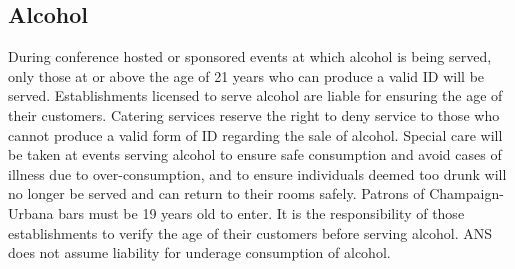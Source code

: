 \subsection{Alcohol}
During conference hosted or sponsored events at which alcohol is being served, only those at or above the age of 21 years who can produce a valid ID will be served. Establishments licensed to serve alcohol are liable for ensuring the age of their customers. Catering services reserve the right to deny service to those who cannot produce a valid form of ID regarding the sale of alcohol. Special care will be taken at events serving alcohol to ensure safe consumption and avoid cases of illness due to over-consumption, and to ensure individuals deemed too drunk will no longer be served and can return to their rooms safely.
Patrons of Champaign-Urbana bars must be 19 years old to enter. It is the responsibility of those establishments to verify the age of their customers before serving alcohol. ANS does not assume liability for underage consumption of alcohol.

